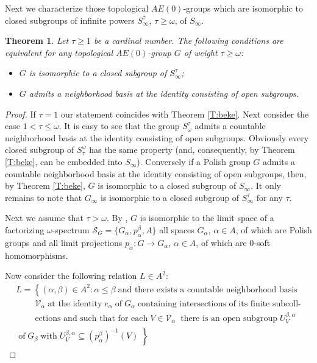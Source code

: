 \documentclass[12pt,draft]{amsart}
\theoremstyle{plain}
\newtheorem{thm}{Theorem}[section]
\theoremstyle{definition}
\numberwithin{equation}{section}
\begin{document}
Next we characterize those topological $AE(0)$-groups
which are isomorphic to closed subgroups of infinite powers
$S_{\infty}^{\tau}$, $\tau \geq \omega$, of $S_{\infty}$.

\begin{thm}\label{T:closed}
Let $\tau \geq 1$ be a cardinal number. The following conditions are equivalent for any
topological $AE(0)$-group $G$ of weight $\tau \geq \omega$:
\begin{itemize}
\item[(i)]
$G$ is isomorphic to a closed subgroup of $S_{\infty}^{\tau}$;
\item[(ii)]
$G$ admits a neighborhood basis at the identity
consisting of open subgroups.
\end{itemize}
\end{thm}
\begin{proof}
If $\tau = 1$ our statement coincides with Theorem \ref{T:beke}. Next
consider the case $1 < \tau \leq\omega$. It is easy to see that the group
$S_{\omega}^{\tau}$ admits a countable neighborhood basis
at the identity consisting of open subgroups. Obviously 
every closed subgroup of $S^{\omega}_{\tau}$ has the same
property (and, consequently, by Theorem \ref{T:beke}, can be
embedded into $S_{\infty}$). Conversely if a Polish group $G$ admits a countable
neighborhood basis at the identity
consisting of open subgroups, then, by Theorem \ref{T:beke},
$G$ is isomorphic to a closed subgroup of $S_{\infty}$. It only
remains to note that $G_{\infty}$ is isomorphic to a closed
subgroup of $S_{\infty}^{\tau}$ for any $\tau$.

Next we assume that $\tau > \omega$. By
\cite[Lemma 8.2.1]{chibook96}, $G$ is isomorphic
to the limit space of a factorizing $\omega$-spectrum
${\mathcal S}_{G} = \{ G_{\alpha}, p_{\alpha}^{\beta}, A\}$
all spaces $G_{\alpha}$, $\alpha \in A$, of which are Polish
groups and all limit projections $p_{\alpha} \colon G \to G_{\alpha}$,
$\alpha \in A$,
of which are $0$-soft homomorphisms.

Now consider the following relation $L \in A^{2}$:
\begin{multline*}
 L = \left\{ (\alpha ,\beta ) \in A^{2} \colon \alpha \leq \beta
\;\text{and there exists a countable neighborhood basis}\right.\\
 \;\;\;\;\;\;\;\; {\mathcal V}_{\alpha} \;\text{at
the identity}\; e_{\alpha} \;\text{of}\; G_{\alpha} \; \text{containing
intersections of its finite subcoll-}\\
\;\;\;\;\;\;\;\;\text{ections and such that for each}\; V \in {\mathcal V}_{\alpha}\;\;
\text{there is an open subgroup} \; U^{\beta ,\alpha}_{V}\\ 
\left.  \; \text{of}\; G_{\beta}\;
\text{with}\; U_{V}^{\beta ,\alpha} \subseteq
\left( p_{\alpha}^{\beta}\right)^{-1}(V)\; \right\}\;\;\;\;\;\;\;\;\;\;\;\;\;\;\;\;\;\;\;\;\;\;\;\;\;\;
\;\;\;\;\;\;\;\;\;\;\;\;\;\;\;\;\;\;\;\;\;\;\;\;\;
\;\;\;\;\;\;\;
\end{multline*}


\end{proof}
\end{document}
